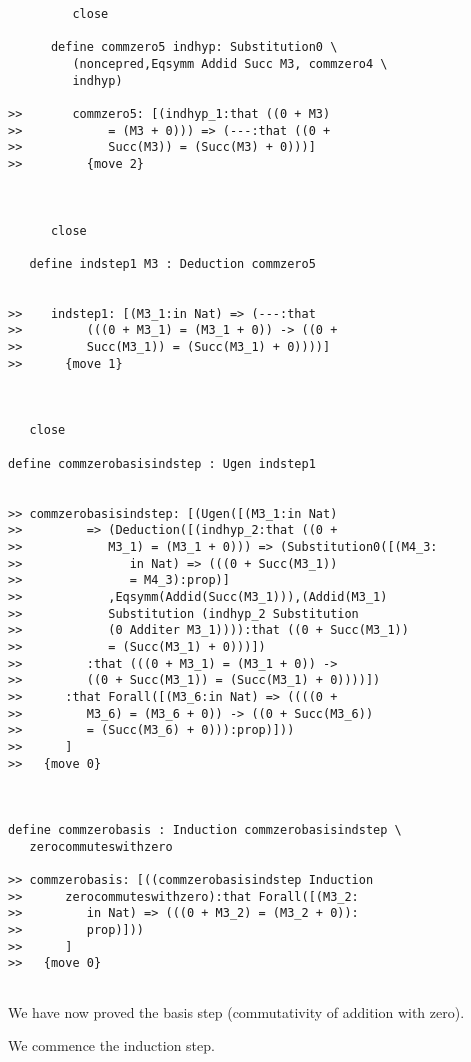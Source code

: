 \documentclass[12pt]{article}
\begin{document}
\begin{verbatim}
         close

      define commzero5 indhyp: Substitution0 \
         (noncepred,Eqsymm Addid Succ M3, commzero4 \
         indhyp)

>>       commzero5: [(indhyp_1:that ((0 + M3)
>>            = (M3 + 0))) => (---:that ((0 +
>>            Succ(M3)) = (Succ(M3) + 0)))]
>>         {move 2}



      close

   define indstep1 M3 : Deduction commzero5


>>    indstep1: [(M3_1:in Nat) => (---:that
>>         (((0 + M3_1) = (M3_1 + 0)) -> ((0 +
>>         Succ(M3_1)) = (Succ(M3_1) + 0))))]
>>      {move 1}



   close

define commzerobasisindstep : Ugen indstep1


>> commzerobasisindstep: [(Ugen([(M3_1:in Nat)
>>         => (Deduction([(indhyp_2:that ((0 +
>>            M3_1) = (M3_1 + 0))) => (Substitution0([(M4_3:
>>               in Nat) => (((0 + Succ(M3_1))
>>               = M4_3):prop)]
>>            ,Eqsymm(Addid(Succ(M3_1))),(Addid(M3_1)
>>            Substitution (indhyp_2 Substitution
>>            (0 Additer M3_1)))):that ((0 + Succ(M3_1))
>>            = (Succ(M3_1) + 0)))])
>>         :that (((0 + M3_1) = (M3_1 + 0)) ->
>>         ((0 + Succ(M3_1)) = (Succ(M3_1) + 0))))])
>>      :that Forall([(M3_6:in Nat) => ((((0 +
>>         M3_6) = (M3_6 + 0)) -> ((0 + Succ(M3_6))
>>         = (Succ(M3_6) + 0))):prop)]))
>>      ]
>>   {move 0}



define commzerobasis : Induction commzerobasisindstep \
   zerocommuteswithzero

>> commzerobasis: [((commzerobasisindstep Induction
>>      zerocommuteswithzero):that Forall([(M3_2:
>>         in Nat) => (((0 + M3_2) = (M3_2 + 0)):
>>         prop)]))
>>      ]
>>   {move 0}


\end{verbatim}

We have now proved the basis step (commutativity of addition with zero).

We commence the induction step.
\end{document}

